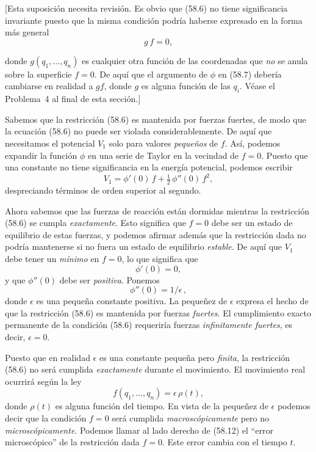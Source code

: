 \documentclass[12pt,a4paper]{book}
\begin{document}
[Esta suposición necesita revisión. Es obvio que (58.6) no tiene significancia invariante puesto que la misma condición podría haberse expresado en la forma más general
\begin{equation}
g\,f = 0, \tag{58.8}
\end{equation}


donde $g(q_1, \ldots, q_n)$ es cualquier otra función de las coordenadas que \textit{no} se anula sobre la superficie $f = 0$. De aquí que el argumento de $\phi$ en (58.7) debería cambiarse en realidad a $gf$, donde $g$ es alguna función de las $q_i$. Véase el Problema~4 al final de esta sección.]

Sabemos que la restricción (58.6) es mantenida por fuerzas fuertes, de modo que la ecuación (58.6) no puede ser violada considerablemente. De aquí que necesitamos el potencial $V_1$ solo para valores \textit{pequeños} de $f$. Así, podemos expandir la función $\phi$ en una serie de Taylor en la vecindad de $f = 0$. Puesto que una constante no tiene significancia en la energía potencial, podemos escribir
\begin{equation}
V_1 = \phi'(0)\,f + \tfrac{1}{2}\,\phi''(0)\,f^2, \tag{58.9}
\end{equation}
despreciando términos de orden superior al segundo.

Ahora sabemos que las fuerzas de reacción están dormidas mientras la restricción (58.6) se cumpla \textit{exactamente}. Esto significa que $f = 0$ debe ser un estado de equilibrio de estas fuerzas, y podemos afirmar además que la restricción dada no podría mantenerse si no fuera un estado de equilibrio \textit{estable}. De aquí que $V_1$ debe tener un \textit{mínimo} en $f = 0$, lo que significa que
\begin{equation}
\phi'(0) = 0, \tag{58.10}
\end{equation}
y que $\phi''(0)$ debe ser \textit{positiva}. Ponemos
\begin{equation}
\phi''(0) = 1/\epsilon\,, \tag{58.11}
\end{equation}
donde $\epsilon$ es una pequeña constante positiva. La pequeñez de $\epsilon$ expresa el hecho de que la restricción (58.6) es mantenida por fuerzas \textit{fuertes}. El cumplimiento exacto permanente de la condición (58.6) requeriría fuerzas \textit{infinitamente fuertes}, es decir, $\epsilon = 0$.

Puesto que en realidad $\epsilon$ es una constante pequeña pero \textit{finita}, la restricción (58.6) no será cumplida \textit{exactamente} durante el movimiento. El movimiento real ocurrirá según la ley
\begin{equation}
f(q_1, \ldots, q_n) = \epsilon\,\rho(t), \tag{58.12}
\end{equation}
donde $\rho(t)$ es alguna función del tiempo. En vista de la pequeñez de $\epsilon$ podemos decir que la condición $f = 0$ será cumplida \textit{macroscópicamente} pero no \textit{microscópicamente}. Podemos llamar al lado derecho de (58.12) el ``error microscópico'' de la restricción dada $f = 0$. Este error cambia con el tiempo $t$.
\end{document}
